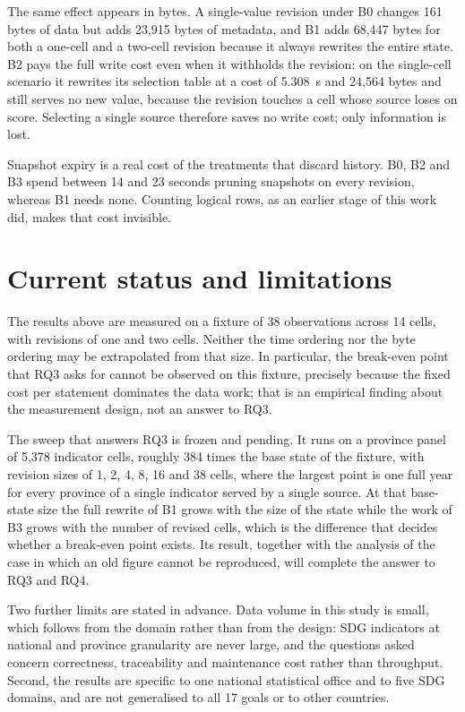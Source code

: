 \documentclass[a4paper,fleqn]{cas-dc}
\begin{document}
The same effect appears in bytes. A single-value revision under B0 changes 161
bytes of data but adds 23,915 bytes of metadata, and B1 adds 68,447 bytes for
both a one-cell and a two-cell revision because it always rewrites the entire
state. B2 pays the full write cost even when it withholds the revision: on the
single-cell scenario it rewrites its selection table at a cost of 5.308~s and
24,564 bytes and still serves no new value, because the revision touches a cell
whose source loses on score. Selecting a single source therefore saves no write
cost; only information is lost.

Snapshot expiry is a real cost of the treatments that discard history. B0, B2 and
B3 spend between 14 and 23 seconds pruning snapshots on every revision, whereas
B1 needs none. Counting logical rows, as an earlier stage of this work did,
makes that cost invisible.

\section{Current status and limitations}\label{sec:status}

The results above are measured on a fixture of 38 observations across 14 cells,
with revisions of one and two cells. Neither the time ordering nor the byte
ordering may be extrapolated from that size. In particular, the break-even point
that RQ3 asks for cannot be observed on this fixture, precisely because the
fixed cost per statement dominates the data work; that is an empirical finding
about the measurement design, not an answer to RQ3.

The sweep that answers RQ3 is frozen and pending. It runs on a province panel of
5,378 indicator cells, roughly 384 times the base state of the fixture, with
revision sizes of 1, 2, 4, 8, 16 and 38 cells, where the largest point is one
full year for every province of a single indicator served by a single source. At
that base-state size the full rewrite of B1 grows with the size of the state
while the work of B3 grows with the number of revised cells, which is the
difference that decides whether a break-even point exists. Its result, together
with the analysis of the case in which an old figure cannot be reproduced, will
complete the answer to RQ3 and RQ4.

Two further limits are stated in advance. Data volume in this study is small,
which follows from the domain rather than from the design: SDG indicators at
national and province granularity are never large, and the questions asked
concern correctness, traceability and maintenance cost rather than throughput.
Second, the results are specific to one national statistical office and to five
SDG domains, and are not generalised to all 17 goals or to other countries.
\end{document}
